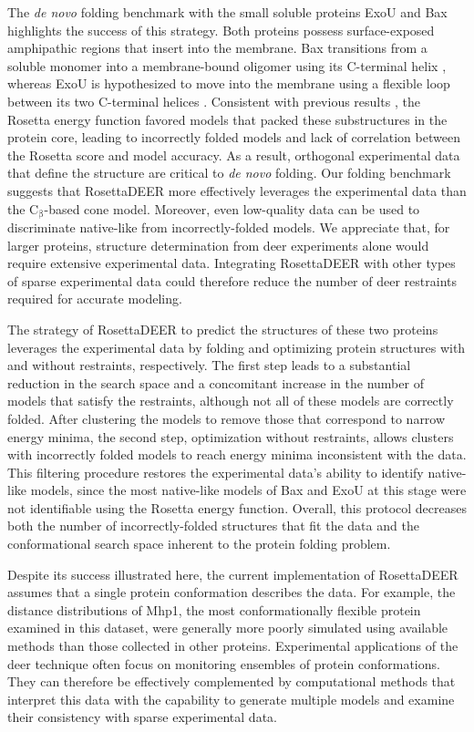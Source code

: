 The \emph{de novo} folding benchmark with the small soluble proteins ExoU and Bax highlights the success of this strategy. Both proteins possess surface-exposed amphipathic regions that insert into the membrane. Bax transitions from a soluble monomer into a membrane-bound oligomer using its C-terminal helix \citep*{Bleicken2014}, whereas ExoU is hypothesized to move into the membrane using a flexible loop between its two C-terminal helices \citep*{Tessmer2017}. Consistent with previous results \citep*{Fischer2017, Fischer2016}, the Rosetta energy function favored models that packed these substructures in the protein core, leading to incorrectly folded models and lack of correlation between the Rosetta score and model accuracy. As a result, orthogonal experimental data that define the structure are critical to \emph{de novo} folding. Our folding benchmark suggests that RosettaDEER more effectively leverages the experimental data than the $\mathrm{C_{\upbeta}}$-based \gls{cone} model. Moreover, even low-quality data can be used to discriminate native-like from incorrectly-folded models. We appreciate that, for larger proteins, structure determination from \gls{deer} experiments alone would require extensive experimental data. Integrating RosettaDEER with other types of sparse experimental data could therefore reduce the number of \gls{deer} restraints required for accurate modeling.

The strategy of RosettaDEER to predict the structures of these two proteins leverages the experimental data by folding and optimizing protein structures with and without restraints, respectively. The first step leads to a substantial reduction in the search space and a concomitant increase in the number of models that satisfy the restraints, although not all of these models are correctly folded. After clustering the models to remove those that correspond to narrow energy minima, the second step, optimization without restraints, allows clusters with incorrectly folded models to reach energy minima inconsistent with the data. This filtering procedure restores the experimental data’s ability to identify native-like models, since the most native-like models of Bax and ExoU at this stage were not identifiable using the Rosetta energy function. Overall, this protocol decreases both the number of incorrectly-folded structures that fit the data and the conformational search space inherent to the protein folding problem.

Despite its success illustrated here, the current implementation of RosettaDEER assumes that a single protein conformation describes the data. For example, the distance distributions of Mhp1, the most conformationally flexible protein examined in this dataset, were generally more poorly simulated using available methods than those collected in other proteins. Experimental applications of the \gls{deer} technique often focus on monitoring ensembles of protein conformations. They can therefore be effectively complemented by computational methods that interpret this data with the capability to generate multiple models and examine their consistency with sparse experimental data.


